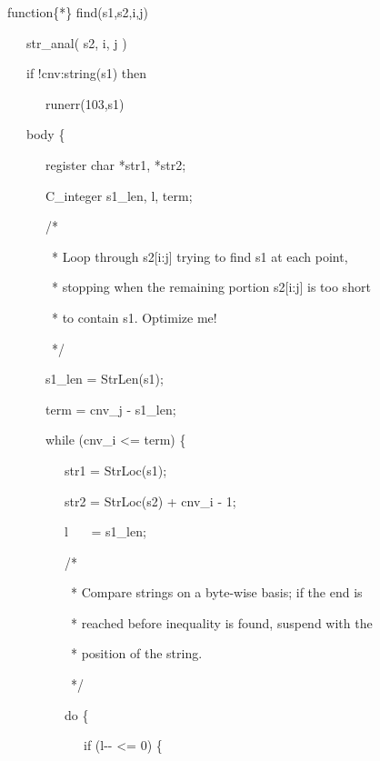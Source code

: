 {\ttfamily\mdseries
function\{*\} find(s1,s2,i,j)}

{\ttfamily\mdseries
\ \ \ str\_anal( s2, i, j )}

{\ttfamily\mdseries
\ \ \ if !cnv:string(s1) then}

{\ttfamily\mdseries
\ \ \ \ \ \ runerr(103,s1)}

{\ttfamily\mdseries
\ \ \ body \{}

{\ttfamily\mdseries
\ \ \ \ \ \ register char *str1, *str2;}

{\ttfamily\mdseries
\ \ \ \ \ \ C\_integer s1\_len, l, term;}


\bigskip

{\ttfamily\mdseries
\ \ \ \ \ \ /*}

{\ttfamily\mdseries
\ \ \ \ \ \ \ * Loop through s2[i:j] trying to find s1 at each point,}

{\ttfamily\mdseries
\ \ \ \ \ \ \ * stopping when the remaining portion s2[i:j] is too short}

{\ttfamily\mdseries
\ \ \ \ \ \ \ * to contain s1. Optimize me!}

{\ttfamily\mdseries
\ \ \ \ \ \ \ */}

{\ttfamily\mdseries
\ \ \ \ \ \ s1\_len = StrLen(s1);}

{\ttfamily\mdseries
\ \ \ \ \ \ term = cnv\_j - s1\_len;}

{\ttfamily\mdseries
\ \ \ \ \ \ while (cnv\_i {\textless}= term) \{}

{\ttfamily\mdseries
\ \ \ \ \ \ \ \ \ str1 = StrLoc(s1);}

{\ttfamily\mdseries
\ \ \ \ \ \ \ \ \ str2 = StrLoc(s2) + cnv\_i - 1;}

{\ttfamily\mdseries
\ \ \ \ \ \ \ \ \ l \ \ \ = s1\_len;}


\bigskip

{\ttfamily\mdseries
\ \ \ \ \ \ \ \ \ /*}

{\ttfamily\mdseries
\ \ \ \ \ \ \ \ \ \ * Compare strings on a byte-wise basis; if the end is}

{\ttfamily\mdseries
\ \ \ \ \ \ \ \ \ \ * reached before inequality is found, suspend with the}

{\ttfamily\mdseries
\ \ \ \ \ \ \ \ \ \ * position of the string.}

{\ttfamily\mdseries
\ \ \ \ \ \ \ \ \ \ */}

{\ttfamily\mdseries
\ \ \ \ \ \ \ \ \ do \{}

{\ttfamily\mdseries
\ \ \ \ \ \ \ \ \ \ \ \ if (l-{}- {\textless}= 0) \{}

